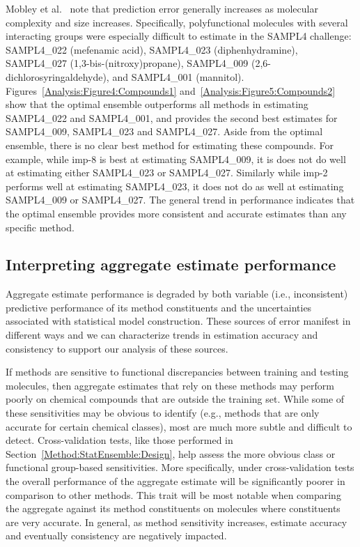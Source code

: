\documentclass[journal=jpcbfk, manuscript=article]{achemso}
\newcommand{\+}[1]{\ensuremath{\mathbf{#1}}}
\begin{document}
Mobley et al.~\cite{Mobley:2014} note that prediction error generally increases as molecular complexity and size increases. 
Specifically, polyfunctional molecules with several interacting groups were especially difficult to estimate in the SAMPL4 challenge: SAMPL4\_022 (mefenamic acid), SAMPL4\_023 (diphenhydramine), SAMPL4\_027 (1,3-bis-(nitroxy)propane), SAMPL4\_009 (2,6-dichlorosyringaldehyde), and SAMPL4\_001 (mannitol). 
Figures~\ref{Analysis:Figure4:Compounds1} and~\ref{Analysis:Figure5:Compounds2} show that the optimal ensemble outperforms all methods in estimating SAMPL4\_022 and SAMPL4\_001, and provides the second best estimates for SAMPL4\_009, SAMPL4\_023 and SAMPL4\_027.
Aside from the optimal ensemble, there is no clear best method for estimating these compounds.
For example, while imp-8 is best at estimating SAMPL4\_009, it is does not do well at estimating either SAMPL4\_023 or SAMPL4\_027.
Similarly while imp-2 performs well at estimating SAMPL4\_023, it does not do as well at estimating SAMPL4\_009 or SAMPL4\_027.
The general trend in performance indicates that the optimal ensemble provides more consistent and accurate estimates than any specific method. 


\subsection{Interpreting aggregate estimate performance}
Aggregate estimate performance is degraded by both variable (i.e., inconsistent) predictive performance of its method constituents and the uncertainties associated with statistical model construction.
These sources of error manifest in different ways and we can characterize trends in estimation accuracy and consistency to support our analysis of these sources.

If methods are sensitive to functional discrepancies between training and testing molecules, then aggregate estimates that rely on these methods may perform poorly on chemical  compounds that are outside the training set. 
While some of these sensitivities may be obvious to identify (e.g., methods that are only accurate for certain chemical classes), most are much more subtle and difficult to detect. 
Cross-validation tests, like those performed in Section~\ref{Method:StatEnsemble:Design}, help assess the more obvious class or functional group-based sensitivities.
More specifically, under cross-validation tests the overall performance of the aggregate estimate will be significantly poorer in comparison to other methods. 
This trait will be most notable when comparing the aggregate against its method constituents on molecules where constituents are very accurate.
In general, as method sensitivity increases, estimate accuracy and eventually consistency are negatively impacted.
\end{document}
